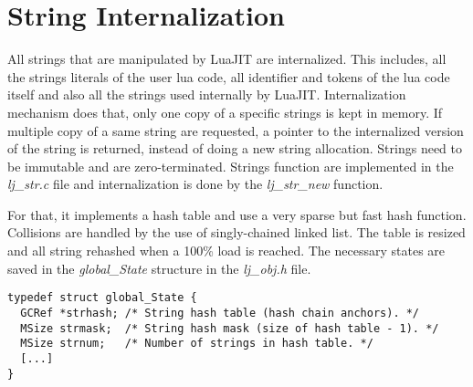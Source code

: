 
\section{String Internalization}
\label{Sec:string-inter}

All strings that are manipulated by LuaJIT are internalized. This includes, all
the strings literals of the user lua code, all identifier and tokens of the lua
code itself and also all the strings used internally by LuaJIT. Internalization
mechanism does that, only one copy of a specific strings is kept in memory. If
multiple copy of a same string are requested, a pointer to the internalized
version of the string is returned, instead of doing a new string allocation.
Strings need to be immutable and are zero-terminated. Strings function are
implemented in the \emph{lj\_str.c} file and internalization is done by the
\emph{lj\_str\_new} function.

For that, it implements a hash table and use a very sparse but fast hash
function. Collisions are handled by the use of singly-chained linked list.
The table is resized and all string rehashed when a 100\% load is reached.
The necessary states are saved in the \emph{global\_State} structure in the
\emph{lj\_obj.h} file.

\begin{lstlisting}[style=CStyle]
typedef struct global_State {
  GCRef *strhash; /* String hash table (hash chain anchors). */
  MSize strmask;  /* String hash mask (size of hash table - 1). */
  MSize strnum;   /* Number of strings in hash table. */
  [...]
}
\end{lstlisting}


